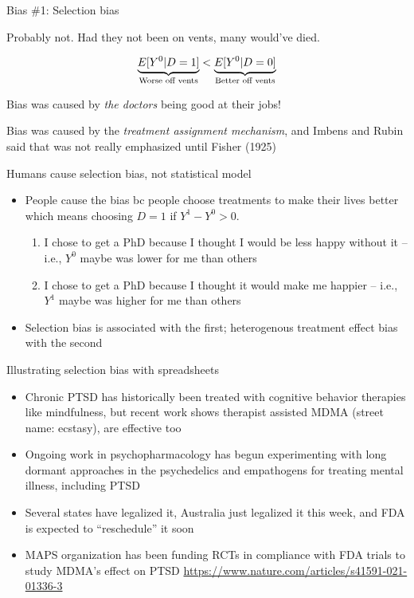 \documentclass{beamer}
\begin{document}
\begin{frame}{Bias \#1: Selection bias}

Probably not. Had they not been on vents, many would've died.

\bigskip

  $$\underbrace{E[Y^0|D=1]}_{\mathclap{\text{Worse off vents}}} < \underbrace{E[Y^0|D=0]}_{\mathclap{\text{Better off vents}}}$$

\bigskip

Bias was caused by \emph{the doctors} being good at their jobs!  

\bigskip

Bias was caused by the \emph{treatment assignment mechanism}, and Imbens and Rubin said that was not really emphasized until Fisher (1925) 


\end{frame}




\begin{frame}{Humans cause selection bias, not statistical model}

\begin{itemize}
\item People cause the bias bc people choose treatments to make their lives better which means choosing $D=1$ if $Y^1-Y^0>0$.
	\begin{enumerate}
	\item I chose to get a PhD because I thought I would be less happy without it -- i.e., $Y^0$ maybe was lower for me than others
	\item I chose to get a PhD because I thought it would make me happier -- i.e., $Y^1$ maybe was higher for me than others
	\end{enumerate}
\item Selection bias is associated with the first; heterogenous treatment effect bias with the second
\end{itemize}

\end{frame}




\begin{frame}{Illustrating selection bias with spreadsheets}

  \begin{itemize}
    \item Chronic PTSD has historically been treated with cognitive behavior therapies like mindfulness, but recent work shows therapist assisted MDMA (street name: ecstasy), are effective too
    \item Ongoing work in psychopharmacology has begun experimenting with long dormant approaches in the psychedelics and empathogens for treating mental illness, including PTSD
    \item Several states have legalized it, Australia just legalized it this week, and FDA is expected to ``reschedule'' it soon
    \item MAPS organization has been funding RCTs in compliance with FDA trials to study MDMA's effect on PTSD \url{https://www.nature.com/articles/s41591-021-01336-3}
    \end{itemize}
    
\end{frame}
\end{document}
